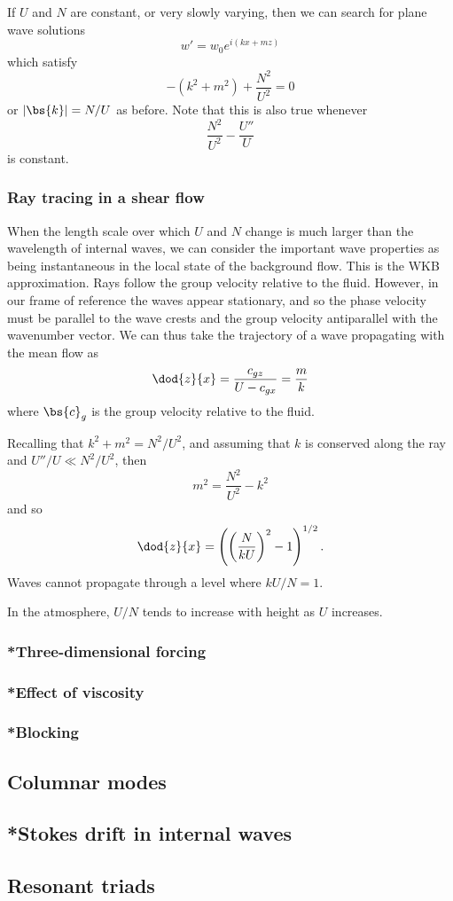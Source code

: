 If $U$ and $N$ are constant, or very slowly varying, then we can search for plane wave solutions
\begin{equation}
	w' = w_0 e^{i(kx+mz)}
\end{equation}
which satisfy
\begin{equation}
	-(k^2 + m^2) + \frac{N^2}{U^2} = 0
\end{equation}
or $|\bs{k}| = N/U$ as before. Note that this is also true whenever
\begin{equation}
	\frac{N^2}{U^2} - \frac{U''}{U} 
\end{equation}
is constant.

\subsubsection{Ray tracing in a shear flow}

When the length scale over which $U$ and $N$ change is much larger than the wavelength of internal waves, we can consider the important wave properties as being instantaneous in the local state of the background flow. This is the WKB approximation. Rays follow the group velocity relative to the fluid. However, in our frame of reference the waves appear stationary, and so the phase velocity must be parallel to the wave crests and the group velocity antiparallel with the wavenumber vector. We can thus take the trajectory of a wave propagating with the mean flow as
\begin{equation}
	\dod{z}{x} = \frac{c_{gz}}{U - c_{gx}} = \frac{m}{k}
\end{equation}
where $\bs{c}_g$ is the group velocity relative to the fluid.

Recalling that $k^2 + m^2 = N^2 / U^2$, and assuming that $k$ is conserved along the ray and $U''/U \ll N^2 /U^2$, then
\begin{equation}
	m^2 = \frac{N^2}{U^2} - k^2
\end{equation}
and so 
\begin{equation}
	\dod{z}{x} = \left(\left(\frac{N}{kU}\right)^2 - 1\right)^{1/2}.
\end{equation}
Waves cannot propagate through a level where $kU/N = 1$.

In the atmosphere, $U/N$ tends to increase with height as $U$ increases.

\subsubsection{*Three-dimensional forcing}
\subsubsection{*Effect of viscosity}
\subsubsection{*Blocking}

\subsection{Columnar modes}
\subsection{*Stokes drift in internal waves}
\subsection{Resonant triads}
